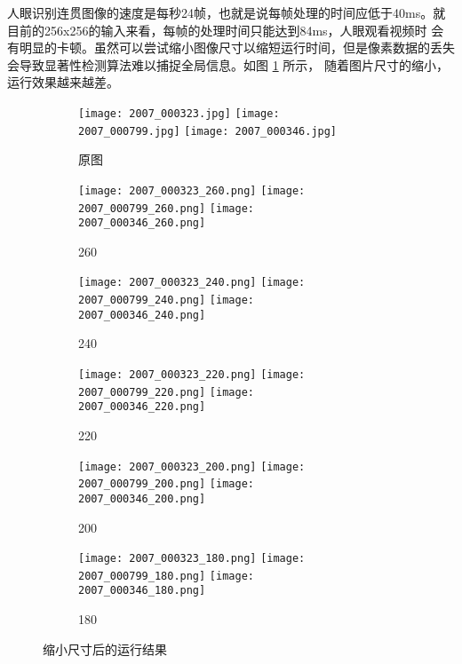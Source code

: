 人眼识别连贯图像的速度是每秒24帧，也就是说每帧处理的时间应低于40ms。就目前的256x256的输入来看，每帧的处理时间只能达到84ms，人眼观看视频时
会有明显的卡顿。虽然可以尝试缩小图像尺寸以缩短运行时间，但是像素数据的丢失会导致显著性检测算法难以捕捉全局信息。如图 \ref{fig:result} 所示，
随着图片尺寸的缩小，运行效果越来越差。

\begin{figure}[h]
    \centering
    \begin{subfigure}{.1\textwidth}
        \centering
        \texttt{[image: 2007\_000323.jpg]}
        \centering
        \texttt{[image: 2007\_000799.jpg]}
        \centering
        \texttt{[image: 2007\_000346.jpg]}
        \caption{原图}
    \end{subfigure}
    \begin{subfigure}{.1\textwidth}
        \centering
        \texttt{[image: 2007\_000323\_260.png]}
        \centering
        \texttt{[image: 2007\_000799\_260.png]}
        \centering
        \texttt{[image: 2007\_000346\_260.png]}
        \caption{260}
    \end{subfigure}
    \begin{subfigure}{.1\textwidth}
        \centering
        \texttt{[image: 2007\_000323\_240.png]}
        \centering
        \texttt{[image: 2007\_000799\_240.png]}
        \centering
        \texttt{[image: 2007\_000346\_240.png]}
        \caption{240}
    \end{subfigure}
    \begin{subfigure}{.1\textwidth}
        \centering
        \texttt{[image: 2007\_000323\_220.png]}
        \centering
        \texttt{[image: 2007\_000799\_220.png]}
        \centering
        \texttt{[image: 2007\_000346\_220.png]}
        \caption{220}
    \end{subfigure}
    \begin{subfigure}{.1\textwidth}
        \centering
        \texttt{[image: 2007\_000323\_200.png]}
        \centering
        \texttt{[image: 2007\_000799\_200.png]}
        \centering
        \texttt{[image: 2007\_000346\_200.png]}
        \caption{200}
    \end{subfigure}
    \begin{subfigure}{.1\textwidth}
        \centering
        \texttt{[image: 2007\_000323\_180.png]}
        \centering
        \texttt{[image: 2007\_000799\_180.png]}
        \centering
        \texttt{[image: 2007\_000346\_180.png]}
        \caption{180}
    \end{subfigure}
    \caption{缩小尺寸后的运行结果}
    \label{fig:result}
\end{figure}

